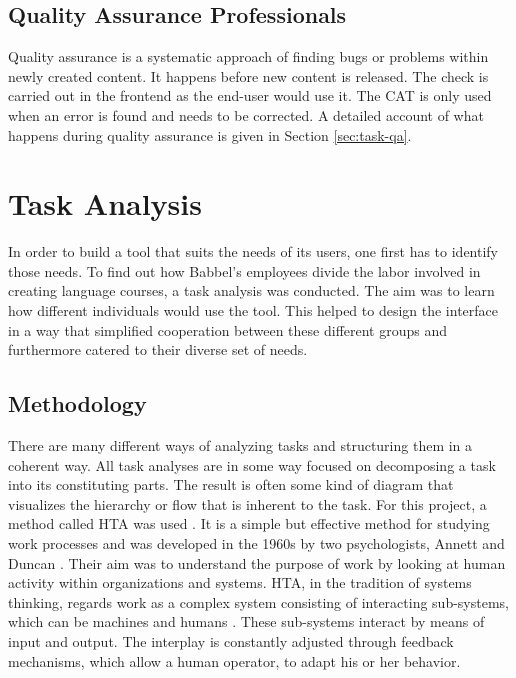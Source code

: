 
\subsection{Quality Assurance Professionals}
Quality assurance is a systematic approach of finding bugs or problems within newly created content. It happens before new content is released. The check is carried out in the frontend as the end-user would use it. The CAT is only used when an error is found and needs to be corrected. A detailed account of what happens during quality assurance is given in Section \ref{sec:task-qa}.

\section{Task Analysis} \label{section:task-analysis}
In order to build a tool that suits the needs of its users, one first has to identify those needs. To find out how Babbel's employees divide the labor involved in creating language courses, a task analysis was conducted. The aim was to learn how different individuals would use the tool. This helped to design the interface in a way that simplified cooperation between these different groups and furthermore catered to their diverse set of needs.

\subsection{Methodology}
There are many different ways of analyzing tasks and structuring them in a coherent way. All task analyses are in some way focused on decomposing a task into its constituting parts. The result is often some kind of diagram that visualizes the hierarchy or flow that is inherent to the task. For this project, a method called \ac{HTA} was used \cite{hornsby_hierarchical_2010}. It is a simple but effective method for studying work processes and was developed in the 1960s by two psychologists, Annett and Duncan \cite{shepherd_hierarchial_2000}. Their aim was to understand the purpose of work by looking at human activity within organizations and systems. HTA, in the tradition of systems thinking, regards work as a complex system consisting of  interacting sub-systems, which can be machines and humans \cite{shepherd_hierarchial_2000}. These sub-systems interact by means of input and output. The interplay is constantly adjusted through feedback mechanisms, which allow a human operator, to adapt his or her behavior.

